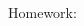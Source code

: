 \documentclass[12pt, a4paper, addpoints]{exam}
\newcommand{\ts}{\vspace{16mm}}
\begin{document}
\begin{questions}
\begin{multicols}{6}
\begin{parts}
\part
\part
\end{parts}
\end{multicols}
\ts




\question  Homework: 

\begin{multicols}{5}
\begin{parts}
\part 
\part 
\part 
\part 
\part 
\part 

\end{parts}
\end{multicols}



\end{questions}
\end{document}
